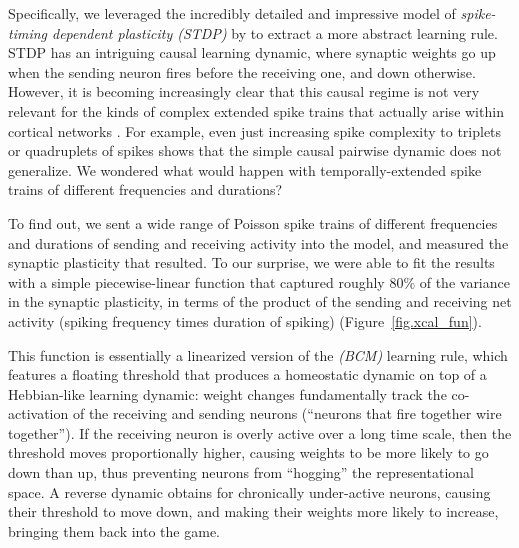 \documentclass[11pt,twoside]{article}
\begin{document}
Specifically, we leveraged the incredibly detailed and impressive model of {\em spike-timing dependent plasticity (STDP)} by  to extract a more abstract learning rule.  STDP has an intriguing causal learning dynamic, where synaptic weights go up when the sending neuron fires before the receiving one, and down otherwise.  However, it is becoming increasingly clear that this causal regime is not very relevant for the kinds of complex extended spike trains that actually arise within cortical networks \cite{stdpsucks}.  For example, even just increasing spike complexity to triplets or quadruplets of spikes shows that the simple causal pairwise dynamic does not generalize.  We wondered what would happen with temporally-extended spike trains of different frequencies and durations?

To find out, we sent a wide range of Poisson spike trains of different frequencies and durations of sending and receiving activity into the  model, and measured the synaptic plasticity that resulted.  To our surprise, we were able to fit the results with a simple piecewise-linear function that captured roughly 80\% of the variance in the synaptic plasticity, in terms of the product of the sending and receiving net activity (spiking frequency times duration of spiking) (Figure~\ref{fig.xcal_fun}).

This function is essentially a linearized version of the  {\em (BCM)} learning rule, which features a floating threshold that produces a homeostatic dynamic on top of a Hebbian-like learning dynamic: weight changes fundamentally track the co-activation of the receiving and sending neurons (``neurons that fire together wire together'').  If the receiving neuron is overly active over a long time scale, then the threshold moves proportionally higher, causing weights to be more likely to go down than up, thus preventing neurons from ``hogging'' the representational space.  A reverse dynamic obtains for chronically under-active neurons, causing their threshold to move down, and making their weights more likely to increase, bringing them back into the game.
\end{document}
